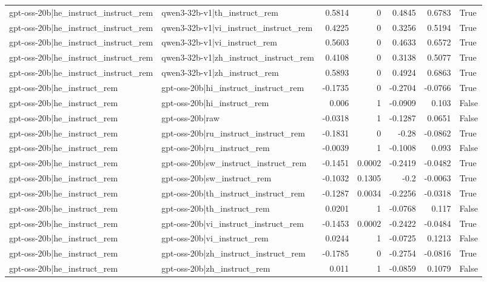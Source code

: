 \begin{table}
\begin{tabular}{l l r r r r l}
gpt-oss-20b|he_instruct_instruct_rem & qwen3-32b-v1|th_instruct_rem & 0.5814 & 0 & 0.4845 & 0.6783 & True \\
gpt-oss-20b|he_instruct_instruct_rem & qwen3-32b-v1|vi_instruct_instruct_rem & 0.4225 & 0 & 0.3256 & 0.5194 & True \\
gpt-oss-20b|he_instruct_instruct_rem & qwen3-32b-v1|vi_instruct_rem & 0.5603 & 0 & 0.4633 & 0.6572 & True \\
gpt-oss-20b|he_instruct_instruct_rem & qwen3-32b-v1|zh_instruct_instruct_rem & 0.4108 & 0 & 0.3138 & 0.5077 & True \\
gpt-oss-20b|he_instruct_instruct_rem & qwen3-32b-v1|zh_instruct_rem & 0.5893 & 0 & 0.4924 & 0.6863 & True \\
gpt-oss-20b|he_instruct_rem & gpt-oss-20b|hi_instruct_instruct_rem & -0.1735 & 0 & -0.2704 & -0.0766 & True \\
gpt-oss-20b|he_instruct_rem & gpt-oss-20b|hi_instruct_rem & 0.006 & 1 & -0.0909 & 0.103 & False \\
gpt-oss-20b|he_instruct_rem & gpt-oss-20b|raw & -0.0318 & 1 & -0.1287 & 0.0651 & False \\
gpt-oss-20b|he_instruct_rem & gpt-oss-20b|ru_instruct_instruct_rem & -0.1831 & 0 & -0.28 & -0.0862 & True \\
gpt-oss-20b|he_instruct_rem & gpt-oss-20b|ru_instruct_rem & -0.0039 & 1 & -0.1008 & 0.093 & False \\
gpt-oss-20b|he_instruct_rem & gpt-oss-20b|sw_instruct_instruct_rem & -0.1451 & 0.0002 & -0.2419 & -0.0482 & True \\
gpt-oss-20b|he_instruct_rem & gpt-oss-20b|sw_instruct_rem & -0.1032 & 0.1305 & -0.2 & -0.0063 & True \\
gpt-oss-20b|he_instruct_rem & gpt-oss-20b|th_instruct_instruct_rem & -0.1287 & 0.0034 & -0.2256 & -0.0318 & True \\
gpt-oss-20b|he_instruct_rem & gpt-oss-20b|th_instruct_rem & 0.0201 & 1 & -0.0768 & 0.117 & False \\
gpt-oss-20b|he_instruct_rem & gpt-oss-20b|vi_instruct_instruct_rem & -0.1453 & 0.0002 & -0.2422 & -0.0484 & True \\
gpt-oss-20b|he_instruct_rem & gpt-oss-20b|vi_instruct_rem & 0.0244 & 1 & -0.0725 & 0.1213 & False \\
gpt-oss-20b|he_instruct_rem & gpt-oss-20b|zh_instruct_instruct_rem & -0.1785 & 0 & -0.2754 & -0.0816 & True \\
gpt-oss-20b|he_instruct_rem & gpt-oss-20b|zh_instruct_rem & 0.011 & 1 & -0.0859 & 0.1079 & False \\

\end{tabular}
\end{table}
